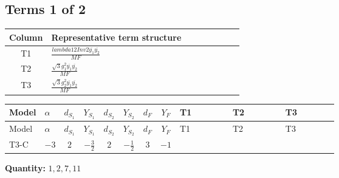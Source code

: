 \documentclass[8pt]{article}
\begin{document}
\begin{landscape}
\subsection*{Terms 1 of 2}
\begin{center}
\begin{tabular}{@{}c >{\raggedright\arraybackslash}p{0.82\linewidth}@{}}
\toprule
Column & Representative term structure \\
\midrule
T1 & \(\displaystyle \frac{lambda12Inv2 \overline{y_{1}} \overline{y_{2}}}{MF}\) \\
\midrule
T2 & \(\displaystyle \frac{\sqrt{3} g_{1}^{2} \overline{y_{1}} \overline{y_{2}}}{MF}\) \\
\midrule
T3 & \(\displaystyle \frac{\sqrt{3} g_{2}^{2} \overline{y_{1}} \overline{y_{2}}}{MF}\) \\
\midrule
\bottomrule
\end{tabular}
\end{center}
\smallskip
\tiny
\begin{longtable}{@{}llcccccc >{\raggedright\arraybackslash}p{0.21\linewidth} >{\raggedright\arraybackslash}p{0.21\linewidth} >{\raggedright\arraybackslash}p{0.21\linewidth}@{}}
\toprule
Model & $\alpha$ & $d_{S_1}$ & $Y_{S_1}$ & $d_{S_2}$ & $Y_{S_2}$ & $d_F$ & $Y_F$ & T1 & T2 & T3 \\
\midrule
\endfirsthead
\toprule
Model & $\alpha$ & $d_{S_1}$ & $Y_{S_1}$ & $d_{S_2}$ & $Y_{S_2}$ & $d_F$ & $Y_F$ & T1 & T2 & T3 \\
\midrule
\endhead
T3-C & $-3$ & $2$ & $-\frac{3}{2}$ & $2$ & $-\frac{1}{2}$ & $3$ & $-1$ & \scriptsize\adjustbox{max width=\linewidth}{$\begin{gathered} \frac{lambda12Inv2 \overline{y_{1}} \overline{y_{2}}}{6 MF}\end{gathered}$} & \scriptsize\adjustbox{max width=\linewidth}{$\begin{gathered} \frac{\sqrt{3} g_{1}^{2} \overline{y_{1}} \overline{y_{2}}}{4 MF}\end{gathered}$} & \scriptsize\adjustbox{max width=\linewidth}{$\begin{gathered} \frac{\sqrt{3} g_{2}^{2} \overline{y_{1}} \overline{y_{2}}}{8 MF}\end{gathered}$} \\
\midrule
\bottomrule
\end{longtable}
\clearpage
\noindent\textbf{Quantity: }$\mathrm{1,2,7,11}$\par\smallskip

\end{landscape}
\end{document}
